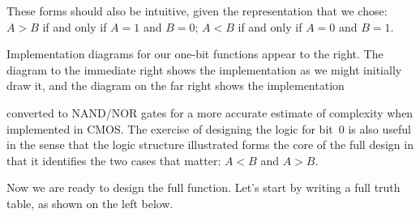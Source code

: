 These forms should also be intuitive, given the representation
that we chose: 
$A>B$ if and only if $A=1$ and $B=0$;
$A<B$ if and only if $A=0$ and $B=1$. 

\begin{minipage}{2.3in}
Implementation diagrams for our one-bit functions appear to the right.
The diagram to the immediate right shows the implementation as we might
initially draw it, and the diagram on the far right shows the 
implementation\linebreak
\end{minipage}\hspace{.25in}%
\begin{minipage}{1.85in}
\vspace{12pt}
\end{minipage}\hspace{.25in}%
\begin{minipage}{1.85in}
\vspace{12pt}
\end{minipage}\mpdone

converted to NAND/NOR gates for a more accurate estimate of complexity
when implemented in CMOS.
%
The exercise of designing the logic for bit~0 is also useful in the sense
that the logic structure illustrated forms the core of the full design
in that it identifies the two cases that matter: $A<B$ and $A>B$.

Now we are ready to design the full function.  Let's start by writing
a full truth table, as shown on the left below.

